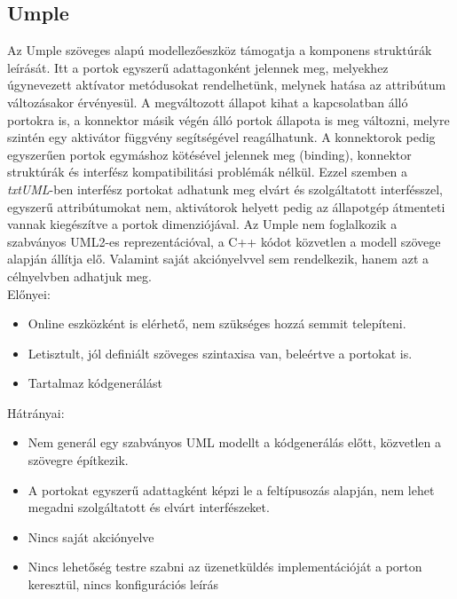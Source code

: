 \documentclass[a4paper,12pt]{report}
\begin{document}
\subsection{Umple}
Az Umple \cite{umple} szöveges alapú modellezőeszköz támogatja a komponens struktúrák leírását. Itt a portok egyszerű adattagonként jelennek meg, melyekhez úgynevezett aktívator metódusokat rendelhetünk, melynek hatása az attribútum változásakor érvényesül. A megváltozott állapot kihat a kapcsolatban álló portokra is, a konnektor másik végén álló portok állapota is meg változni, melyre szintén egy aktivátor függvény segítségével reagálhatunk. A konnektorok pedig egyszerűen portok egymáshoz kötésével jelennek meg (binding), konnektor struktúrák és interfész kompatibilitási problémák nélkül. Ezzel szemben a \textit{txtUML}-ben interfész portokat adhatunk meg elvárt és szolgáltatott interfésszel, egyszerű attribútumokat nem, aktivátorok helyett pedig az állapotgép átmenteti vannak kiegészítve a portok dimenziójával. Az Umple nem foglalkozik a szabványos UML2-es reprezentációval, a C++ kódot közvetlen a modell szövege alapján állítja elő. Valamint saját akciónyelvvel sem rendelkezik, hanem azt a célnyelvben adhatjuk meg. \\

Előnyei:
\begin{itemize}
\item Online eszközként is elérhető, nem szükséges hozzá semmit telepíteni.
\item Letisztult, jól definiált szöveges szintaxisa van, beleértve a portokat is.
\item Tartalmaz kódgenerálást
\end{itemize}
Hátrányai:
\begin{itemize}
\item Nem generál egy szabványos UML modellt a kódgenerálás előtt, közvetlen a szövegre építkezik.
\item A portokat egyszerű adattagként képzi le a feltípusozás alapján, nem lehet megadni szolgáltatott és elvárt interfészeket.
\item Nincs saját akciónyelve
\item Nincs lehetőség testre szabni az üzenetküldés implementációját a porton keresztül, nincs konfigurációs leírás
\end{itemize}
\end{document}
